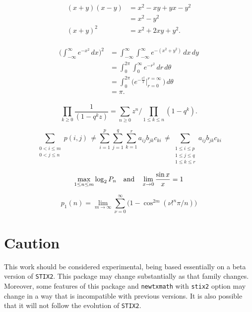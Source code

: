 \documentclass[11pt]{article}
\begin{document}

\begin{align*}
\begin{aligned}
(x+y)(x-y)&=x^2-xy+yx-y^2\\
&=x^2-y^2\\
(x+y)^2&=x^2+2xy+y^2.
\end{aligned}
\end{align*}


\begin{align*}
\begin{aligned}
\biggl(\int_{-\infty}^\infty e^{-x^2}\,dx\biggr)^2
&=\int_{-\infty}^\infty\int_{-\infty}^\infty e^{-(x^2+y^2)}\,dx\,dy\\
&=\int_0^{2\pi}\int_0^\infty e^{-r^2}\,dr\,d\theta\\
&=\int_0^{2\pi}\biggl(e^{-\frac{r^2}{2}}
\biggl|_{r=0}^{r=\infty}\,\biggr)\,d\theta\\
&=\pi.
\end{aligned}
\end{align*}



$$\prod_{k\ge0}\frac{1}{(1-q^kz)}=
\sum_{n\ge0}z^n\bigg/\!\!\prod_{1\le k\le n}(1-q^k).$$

$$\sum_{\substack{\scriptstyle 0< i\le m\\\scriptstyle0<j\le n}}p(i,j) \,\ne
%
%
\sum_{i=1}^p \sum_{j=1}^q \sum_{k=1}^r a_{ij} b_{jk} c_{ki} \,\ne
%
\sum_{\substack{\scriptstyle 1\le i\le p \\ \scriptstyle 1\le j\le q\\
\scriptstyle 1\le k\le r}} a_{ij} b_{jk} c_{ki}$$

$$\max_{1\le n\le m}\log_2P_n \quad \hbox{and} \quad
\lim_{x\to0}\frac{\sin x}{x}=1$$

$$p_1(n)=\lim_{m\to\infty}\sum_{\nu=0}^\infty\bigl(1-\cos^{2m}(\nu!^n\pi/n)\bigr)$$


\section{Caution}
This work should be considered experimental, being based essentially on a beta version of {\tt STIX2}. This package may change substantially as that family changes. Moreover, some features of this package and  {\tt newtxmath} with {\tt stix2} option may change in a way that is incompatible with previous versions. It is also possible that it will not follow the evolution of {\tt STIX2}.
 
\end{document}
